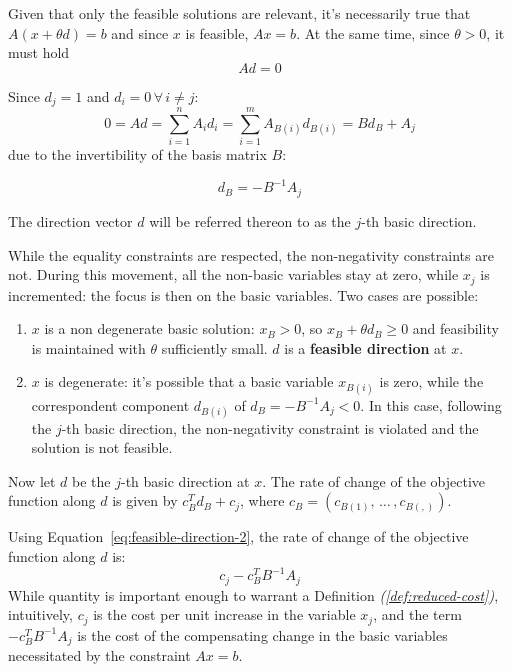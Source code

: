 \documentclass[english]{article}
\begin{document}
Given that only the feasible solutions are relevant, it's necessarily true that \(A \left( x + \theta d \right) = b\) and since \(x\) is feasible, \(A x = b\).
At the same time, since \(\theta > 0\), it must hold
\begin{equation}
  \label{eq:feasible-direction-1}
  A d = 0
  \tag{A}
\end{equation}

Since \(d_j = 1\) and \(d_i = 0 \, \forall \, i \neq j\):
\[ 0 = Ad = \displaystyle \sum_{i=1}^n A_i d_i = \sum_{i=1}^{m} A_{B(i)} d_{B(i)} = B d_B + A_j \]
due to the invertibility of the basis matrix \(B\):

\begin{equation}
  \label{eq:feasible-direction-2}
  d_B = - B^{-1} A_j
  \tag{B}
\end{equation}

The direction vector \(d\) will be referred thereon to as the \(j\)-th basic direction.

While the equality constraints are respected, the non-negativity constraints are not.
During this movement, all the non-basic variables stay at zero, while \(x_j\) is incremented: the focus is then on the basic variables.
Two cases are possible:

\begin{enumerate}[label=\arabic*., ref=(\arabic*)]
  \item \(x\) is a non degenerate basic solution: \(x_B > 0\), so \(x_B + \theta d_B \geq 0\) and feasibility is maintained with \(\theta\) sufficiently small. \(d\) is a \textbf{feasible direction} at \(x\).
  \item \(x\) is degenerate: it's possible that a basic variable \(x_{B(i)}\) is zero, while the correspondent component \(d_{B(i)}\) of \(d_{B} = -B^{-1}A_j < 0\). In this case, following the \(j\)-th basic direction, the non-negativity constraint is violated and the solution is not feasible.
\end{enumerate}

\bigskip
Now let \(d\) be the \(j\)-th basic direction at \(x\).
The rate of change of the objective function along \(d\) is given by \(c^T_B d_B + c_j\), where \(c_B = \left( c_{B(1)}, \, \ldots \,, c_{B(,)} \right)\).

Using Equation~\ref{eq:feasible-direction-2}, the rate of change of the objective function along \(d\) is:
\[ c_j - c^T_B B^{-1} A_j \]
While quantity is important enough to warrant a Definition \textit{(\ref{def:reduced-cost})},
intuitively, \(c_j\) is the cost per unit increase in the variable \(x_j\), and the term \(-c^T_B B^{-1} A_j\) is the cost of the compensating change in the basic variables necessitated by the constraint \(Ax = b\).
\end{document}
